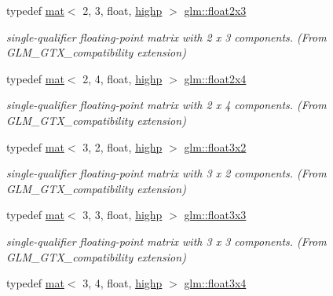 \begin{DoxyCompactItemize}
typedef \hyperlink{structglm_1_1mat}{mat}$<$ 2, 3, float, \hyperlink{namespaceglm_a36ed105b07c7746804d7fdc7cc90ff25ac6f7eab42eacbb10d59a58e95e362074}{highp} $>$ \hyperlink{group__gtx__compatibility_ga32644dc8b8177c22355e4d03b06061ac}{glm\+::float2x3}
\begin{DoxyCompactList}\small\item\em single-\/qualifier floating-\/point matrix with 2 x 3 components. (From G\+L\+M\+\_\+\+G\+T\+X\+\_\+compatibility extension) \end{DoxyCompactList}\item 
typedef \hyperlink{structglm_1_1mat}{mat}$<$ 2, 4, float, \hyperlink{namespaceglm_a36ed105b07c7746804d7fdc7cc90ff25ac6f7eab42eacbb10d59a58e95e362074}{highp} $>$ \hyperlink{group__gtx__compatibility_gadd10766e2393a0e0eaf91ae4d2e85f35}{glm\+::float2x4}
\begin{DoxyCompactList}\small\item\em single-\/qualifier floating-\/point matrix with 2 x 4 components. (From G\+L\+M\+\_\+\+G\+T\+X\+\_\+compatibility extension) \end{DoxyCompactList}\item 
typedef \hyperlink{structglm_1_1mat}{mat}$<$ 3, 2, float, \hyperlink{namespaceglm_a36ed105b07c7746804d7fdc7cc90ff25ac6f7eab42eacbb10d59a58e95e362074}{highp} $>$ \hyperlink{group__gtx__compatibility_ga8e7b0c3f63f470d7a7913453194b0c99}{glm\+::float3x2}
\begin{DoxyCompactList}\small\item\em single-\/qualifier floating-\/point matrix with 3 x 2 components. (From G\+L\+M\+\_\+\+G\+T\+X\+\_\+compatibility extension) \end{DoxyCompactList}\item 
typedef \hyperlink{structglm_1_1mat}{mat}$<$ 3, 3, float, \hyperlink{namespaceglm_a36ed105b07c7746804d7fdc7cc90ff25ac6f7eab42eacbb10d59a58e95e362074}{highp} $>$ \hyperlink{group__gtx__compatibility_ga0c6bbdaa1ebe76fbb55a77d5ca0e2846}{glm\+::float3x3}
\begin{DoxyCompactList}\small\item\em single-\/qualifier floating-\/point matrix with 3 x 3 components. (From G\+L\+M\+\_\+\+G\+T\+X\+\_\+compatibility extension) \end{DoxyCompactList}\item 
typedef \hyperlink{structglm_1_1mat}{mat}$<$ 3, 4, float, \hyperlink{namespaceglm_a36ed105b07c7746804d7fdc7cc90ff25ac6f7eab42eacbb10d59a58e95e362074}{highp} $>$ \hyperlink{group__gtx__compatibility_ga53ae5a5af5943b6557eda4a6502e4484}{glm\+::float3x4}

\end{DoxyCompactItemize}
